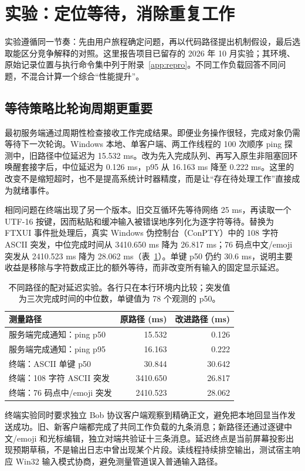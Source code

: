 \section{实验：定位等待，消除重复工作}
\label{sec:evaluation}
实验遵循同一节奏：先由用户旅程确定问题，再以代码路径提出机制假设，最后选取能区分竞争解释的对照。这里报告项目已留存的 2026 年 10 月实验；其环境、原始记录位置与执行命令集中列于附录~\ref{app:repro}。不同工作负载回答不同问题，不混合计算一个综合“性能提升”。

\subsection{等待策略比轮询周期更重要}
最初服务端通过周期性检查接收工作完成结果。即便业务操作很轻，完成对象仍需等待下一次轮询。Windows 本地、单客户端、两工作线程的 100 次顺序 ping 探测中，旧路径中位延迟为 15.532 ms。改为先入完成队列、再写入原生非阻塞回环唤醒套接字后，中位延迟为 0.126 ms，p95 从 16.163 ms 降至 0.222 ms。这里的改变不是缩短超时，也不是提高系统计时器精度，而是让“存在待处理工作”直接成为就绪事件。

相同问题在终端出现了另一个版本。旧交互循环先等待网络 25 ms，再读取一个 UTF-16 按键，因而粘贴和缓冲输入被错误地序列化为逐字符等待。替换为 FTXUI 事件批处理后，真实 Windows 伪控制台（ConPTY）中的 108 字符 ASCII 突发，中位完成时间从 3410.650 ms 降为 26.817 ms；76 码点中文/emoji 突发从 2410.523 ms 降为 28.062 ms（表~\ref{tab:latency}）。单键 p50 仍约 30.6 ms，说明主要收益是移除与字符数成正比的额外等待，而非改变所有输入的固定显示延迟。

\begin{table}[t]
\caption{不同路径的配对延迟实验。各行只在本行环境内比较；突发值为三次完成时间的中位数，单键值为 78 个观测的 p50。}
\label{tab:latency}
\centering\small
\begin{tabular}{lrr}
\toprule
测量路径 & 原路径 (ms) & 改进路径 (ms)\\
\midrule
服务端完成通知：ping p50 & 15.532 & 0.126\\
服务端完成通知：ping p95 & 16.163 & 0.222\\
终端：ASCII 单键 p50 & 30.844 & 30.642\\
终端：108 字符 ASCII 突发 & 3410.650 & 26.817\\
终端：76 码点中/emoji 突发 & 2410.523 & 28.062\\
\bottomrule
\end{tabular}
\end{table}

终端实验同时要求独立 Bob 协议客户端观察到精确正文，避免把本地回显当作发送成功。旧、新客户端都完成了共同工作负载的九条消息；新路径还通过逐键中文/emoji 和光标编辑，独立对端共验证十三条消息。延迟终点是当前屏幕投影出现预期草稿，不是输出日志中曾出现某个片段。读线程持续排空输出，测试宿主响应 Win32 输入模式协商，避免测量管道误入普通输入路径。

